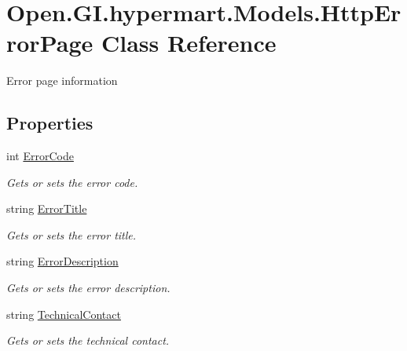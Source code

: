 \hypertarget{class_open_1_1_g_i_1_1hypermart_1_1_models_1_1_http_error_page}{}\section{Open.\+G\+I.\+hypermart.\+Models.\+Http\+Error\+Page Class Reference}
\label{class_open_1_1_g_i_1_1hypermart_1_1_models_1_1_http_error_page}


Error page information  


\subsection*{Properties}
\begin{DoxyCompactItemize}
\item 
int \hyperlink{class_open_1_1_g_i_1_1hypermart_1_1_models_1_1_http_error_page_a1bf51383a2ce1467237ed44fce2214f0}{Error\+Code}
\begin{DoxyCompactList}\small\item\em Gets or sets the error code. \end{DoxyCompactList}\item 
string \hyperlink{class_open_1_1_g_i_1_1hypermart_1_1_models_1_1_http_error_page_a5b8d76394892e084e31faf6781f88d61}{Error\+Title}
\begin{DoxyCompactList}\small\item\em Gets or sets the error title. \end{DoxyCompactList}\item 
string \hyperlink{class_open_1_1_g_i_1_1hypermart_1_1_models_1_1_http_error_page_af5e4bfc21400b65117b1a23090adadb6}{Error\+Description}
\begin{DoxyCompactList}\small\item\em Gets or sets the error description. \end{DoxyCompactList}\item 
string \hyperlink{class_open_1_1_g_i_1_1hypermart_1_1_models_1_1_http_error_page_a0db493a849f0b8a35064d1c48e736cec}{Technical\+Contact}
\begin{DoxyCompactList}\small\item\em Gets or sets the technical contact. \end{DoxyCompactList}\end{DoxyCompactItemize}


